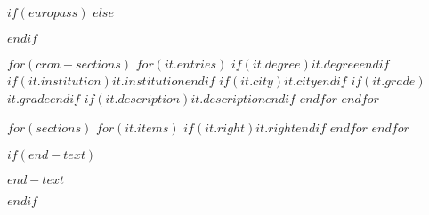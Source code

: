 \documentclass[
$if(europass.nologo)$
  nologo,
$endif$
$if(europass.notitle)$
  notitle,
$endif$
$if(europass.nototpages)$
  nototpages,
$endif$
]{europasscv}
\begin{document}
$if(europass)$
\ecvpersonalinfo
$else$
\maketitle
$endif$

$for(cron-sections)$
  $for(it.entries)$
    {$if(it.degree)$$it.degree$$endif$}
    {$if(it.institution)$$it.institution$$endif$}
    {$if(it.city)$$it.city$$endif$}
    {$if(it.grade)$$it.grade$$endif$}
    {$if(it.description)$$it.description$$endif$}
  $endfor$
$endfor$

$for(sections)$
  $for(it.items)$
    {$if(it.right)$$it.right$$endif$}
  $endfor$
$endfor$

$if(end-text)$
\vfill
\begin{center}
\textit{\small $end-text$}
\end{center}
$endif$
\end{document}
